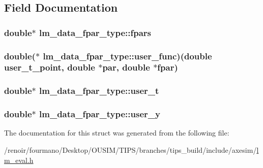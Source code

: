 \subsection{Field Documentation}
\hypertarget{structlm__data__fpar__type_a4d2c4ce97947a43427dcb61fcd71b760}{
\subsubsection[{fpars}]{\setlength{\rightskip}{0pt plus 5cm}double$\ast$ {\bf lm\_\-data\_\-fpar\_\-type::fpars}}}
\label{structlm__data__fpar__type_a4d2c4ce97947a43427dcb61fcd71b760}
\hypertarget{structlm__data__fpar__type_a8748ade3f240db82764c4a8eca132c51}{
\subsubsection[{user\_\-func}]{\setlength{\rightskip}{0pt plus 5cm}double($\ast$ {\bf lm\_\-data\_\-fpar\_\-type::user\_\-func})(double user\_\-t\_\-point, double $\ast$par, double $\ast$fpar)}}
\label{structlm__data__fpar__type_a8748ade3f240db82764c4a8eca132c51}
\hypertarget{structlm__data__fpar__type_a38a73cc8ff86c59a2d63db46b8ab9811}{
\subsubsection[{user\_\-t}]{\setlength{\rightskip}{0pt plus 5cm}double$\ast$ {\bf lm\_\-data\_\-fpar\_\-type::user\_\-t}}}
\label{structlm__data__fpar__type_a38a73cc8ff86c59a2d63db46b8ab9811}
\hypertarget{structlm__data__fpar__type_a1a8a39b4941a2ded8c96b9126240897d}{
\subsubsection[{user\_\-y}]{\setlength{\rightskip}{0pt plus 5cm}double$\ast$ {\bf lm\_\-data\_\-fpar\_\-type::user\_\-y}}}
\label{structlm__data__fpar__type_a1a8a39b4941a2ded8c96b9126240897d}


The documentation for this struct was generated from the following file:\begin{DoxyCompactItemize}
\item 
/renoir/fourmano/Desktop/OUSIM/TIPS/branches/tips\_\-build/include/axesim/\hyperlink{lm__eval_8h}{lm\_\-eval.h}\end{DoxyCompactItemize}
